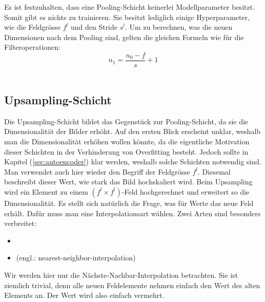 \para{}
Es ist festzuhalten, dass eine Pooling-Schicht keinerlei Modellparameter
besitzt. Somit gibt es nichts zu trainieren. Sie besitzt lediglich einige
Hyperparameter, wie die Feldgrösse $f^l$ und den Stride $s^l$.
\para{}
Um zu berechnen, was die neuen Dimensionen nach dem Pooling sind, gelten die
gleichen Formeln wie für die Filteroperationen:
\\
\begin{equation}
  n_1 = \frac{n_0 - f}{s} + 1
\end{equation}
\\


\cite{deeplearning.ai:cnn}
\cite{Goodfellow-et-al-2016}

\subsection{Upsampling-Schicht}
Die Upsampling-Schicht bildet das Gegenstück zur Pooling-Schicht, da sie die
Dimensionalität der Bilder erhöht. Auf den ersten Blick erscheint unklar,
weshalb man die Dimensionalität erhöhen wollen könnte, da die eigentliche
Motivation dieser Schichten in der Verhinderung von Overfitting besteht. Jedoch
sollte in Kapitel (\ref{sec:autoencoder}) klar werden, weshalb solche Schichten
notwendig sind.
\para{}
Man verwendet auch hier wieder den Begriff der Feldgrösse $f^l$. Diesemal
beschreibt dieser Wert, wie stark das Bild hochskaliert wird. Beim Upsampling
wird ein Element zu einem $(f^l \times f^l)$-Feld hochgerechnet und erweitert so die
Dimensionalität.
\para{}
Es stellt sich natürlich die Frage, was für Werte das neue Feld erhält.
Dafür muss man eine Interpolationsart wählen.
Zwei Arten sind besonders verbreitet:
\begin{itemize}
\item{}
\item{ (engl.: nearest-neighbor-interpolation)}
\end{itemize}
Wir werden hier nur die Nächste-Nachbar-Interpolation betrachten. Sie ist
ziemlich trivial, denn alle neuen Feldelemente nehmen einfach den Wert des alten
Elements an. Der Wert wird also einfach vermehrt.


\cite{deeplearning.ai:cnn}
\cite{Goodfellow-et-al-2016}

\pagebreak
